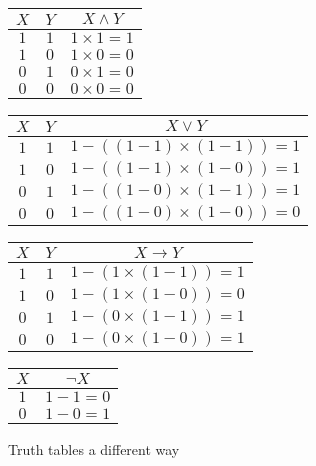 \begin{figure}[h]
\begin{center}
\begin{minipage}{0.45\textwidth}
		\begin{tabular}{|c|c|c|}
			\hline
			$X$ & $Y$ & $X \wedge Y$\\ \hline
			$1$ & $1$ & $1\times 1=1$\\
			$1$ & $0$ & $1 \times 0=0$\\
			$0$ & $1$ & $0 \times 1=0$\\
			$0$ & $0$ & $0\times 0=0$\\ \hline
		\end{tabular}
\end{minipage}
\begin{minipage}{0.45\textwidth}
		\begin{tabular}{|c|c|c|}
			\hline
			$X$ & $Y$ & $X \vee Y$\\ \hline
			$1$ & $1$ & $1-((1-1) \times (1-1))=1$\\
			$1$ & $0$ & $1-((1-1) \times (1-0))=1$\\
			$0$ & $1$ & $1-((1-0) \times (1-1))=1$\\
			$0$ & $0$ & $1-((1-0) \times (1-0))=0$\\\hline
		\end{tabular}
\end{minipage}

\vspace{\baselineskip}
\begin{minipage}{0.45\textwidth}
		\begin{tabular}{|c|c|c|}
			\hline
			$X$ & $Y$ & $X \rightarrow Y$\\ \hline
			$1$ & $1$ & $1-(1 \times (1-1))=1$\\
			$1$ & $0$ & $1-(1 \times (1-0))=0$\\
			$0$ & $1$ & $1-(0 \times (1-1))=1$\\
			$0$ & $0$ & $1-(0 \times (1-0))=1$\\ \hline
		\end{tabular}
\end{minipage}
\begin{minipage}{0.45\textwidth}
		\begin{tabular}{|c|c|}
			\hline
			$X$ & $\neg X$\\ \hline
			$1$ & $1-1=0$\\
			$0$ & $1-0=1$\\ \hline
		\end{tabular}
\end{minipage}
\end{center}
\caption{Truth tables a different way}
\label{ttt}
\end{figure}

